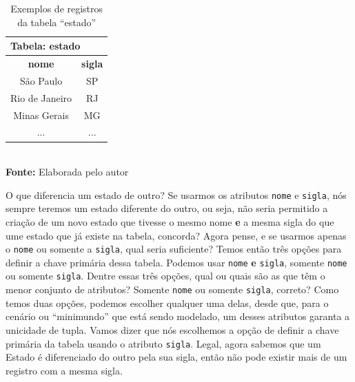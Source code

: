 \FloatBarrier
\begin{table}[ht]
    \centering
    \caption{Exemplos de registros da tabela ``estado''}
	\begin{tabular}{cc}
	    \hline
	    \multicolumn{2}{l}{\textbf{Tabela: estado}} \\ \hline
	    \textbf{nome}  &       \textbf{sigla}       \\ \hline
	      São Paulo    &             SP             \\ \hline
	    Rio de Janeiro &             RJ             \\ \hline
	     Minas Gerais  &             MG             \\ \hline
	         ...       &            ...             \\ \hline
	\end{tabular}
    \\ \vspace{0.2cm}
    \textbf{Fonte:} Elaborada pelo autor
    \label{tab:exemplosEstados}
\end{table}
\FloatBarrier

O que diferencia um estado de outro? Se usarmos os atributos \texttt{nome} e \texttt{sigla}, nós sempre teremos um estado diferente do outro, ou seja, não seria permitido a criação de um novo estado que tivesse o mesmo nome \textbf{e} a mesma sigla do que ume estado que já existe na tabela, concorda? Agora pense, e se usarmos apenas o \texttt{nome} ou somente a \texttt{sigla}, qual seria suficiente? Temos então três opções para definir a chave primária dessa tabela. Podemos usar \texttt{nome} \textbf{e} \texttt{sigla}, somente \texttt{nome} ou somente \texttt{sigla}. Dentre essas três opções, qual ou quais são as que têm o menor conjunto de atributos? Somente \texttt{nome} ou somente \texttt{sigla}, correto? Como temos duas opções, podemos escolher qualquer uma delas, desde que, para o cenário ou ``minimundo'' que está sendo modelado, um desses atributos garanta a unicidade de tupla. Vamos dizer que nós escolhemos a opção de definir a chave primária da tabela usando o atributo \texttt{sigla}. Legal, agora sabemos que um Estado é diferenciado do outro pela sua sigla, então não pode existir mais de um registro com a mesma sigla.

